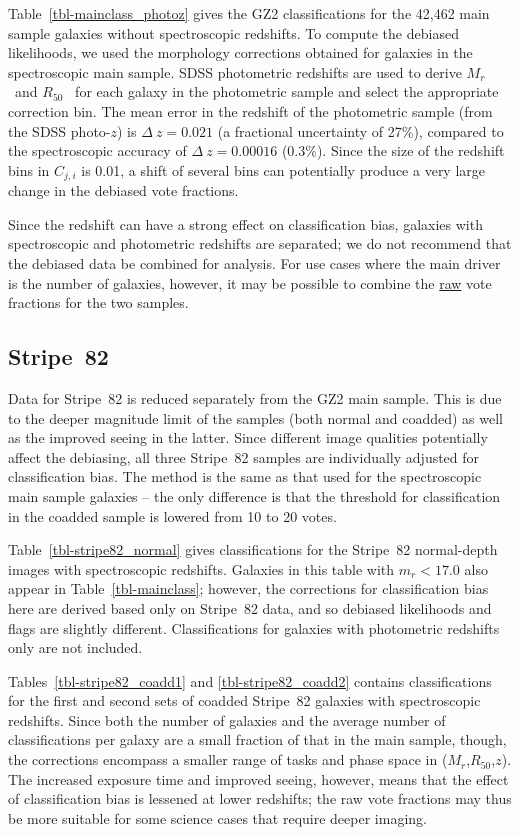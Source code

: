 \documentclass[useAMS,usenatbib]{mn2e}
\newcommand{\mr}{$M_r$}
\newcommand{\rfifty}{$R_{50}$}
\newcommand{\redshift}{$z$}
\begin{document}
Table~\ref{tbl-mainclass_photoz} gives the GZ2 classifications for the 42,462 main sample galaxies without spectroscopic redshifts. To compute the debiased likelihoods, we used the morphology corrections obtained for galaxies in the spectroscopic main sample. SDSS photometric redshifts \citep{csa03} are used to derive \mr~and \rfifty~ for each galaxy in the photometric sample and select the appropriate correction bin. The mean error in the redshift of the photometric sample (from the SDSS photo-$z$) is $\Delta~z=0.021$ (a fractional uncertainty of 27\%), compared to the spectroscopic accuracy of $\Delta~z=0.00016$ (0.3\%). Since the size of the redshift bins in $C_{j,i}$ is 0.01, a shift of several bins can potentially produce a very large change in the debiased vote fractions. 

Since the redshift can have a strong effect on classification bias, galaxies with spectroscopic and photometric redshifts are separated; we do not recommend that the debiased data be combined for analysis. For use cases where the main driver is the number of galaxies, however, it may be possible to combine the \underline{raw} vote fractions for the two samples.

\subsection{Stripe~82}\label{ssec-s82}

Data for Stripe~82 is reduced separately from the GZ2 main sample. This is due to the deeper magnitude limit of the samples (both normal and coadded) as well as the improved seeing in the latter. Since different image qualities potentially affect the debiasing, all three Stripe~82 samples are individually adjusted for classification bias. The method is the same as that used for the spectroscopic main sample galaxies -- the only difference is that the threshold for classification in the coadded sample is lowered from 10 to 20 votes. 

Table~\ref{tbl-stripe82_normal} gives classifications for the Stripe~82 normal-depth images with spectroscopic redshifts. Galaxies in this table with $m_r < 17.0$ also appear in Table~\ref{tbl-mainclass}; however, the corrections for classification bias here are derived based only on Stripe~82 data, and so debiased likelihoods and flags are slightly different. Classifications for galaxies with photometric redshifts only are not included.

Tables~\ref{tbl-stripe82_coadd1} and \ref{tbl-stripe82_coadd2} contains classifications for the first and second sets of coadded Stripe~82 galaxies with spectroscopic redshifts. Since both the number of galaxies and the average number of classifications per galaxy are a small fraction of that in the main sample, though, the corrections encompass a smaller range of tasks and phase space in (\mr,\rfifty,\redshift). The increased exposure time and improved seeing, however, means that the effect of classification bias is lessened at lower redshifts; the raw vote fractions may thus be more suitable for some science cases that require deeper imaging. 
\end{document}
